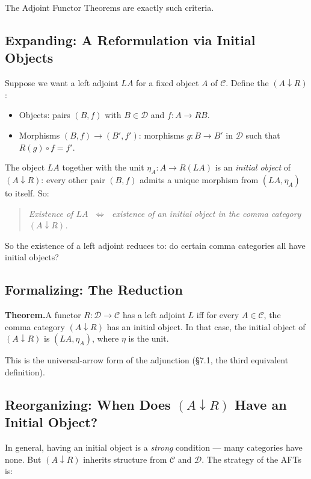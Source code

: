 The Adjoint Functor Theorems are exactly such criteria.

\subsection{Expanding: A Reformulation via Initial Objects}

Suppose we want a left adjoint $L A$ for a fixed object $A$ of $\mathcal{C}$.
Define the  $(A \downarrow R)$:
\begin{itemize}
  \item Objects: pairs $(B, f)$ with $B \in \mathcal{D}$ and $f : A \to R B$.
  \item Morphisms $(B, f) \to (B', f')$: morphisms $g : B \to B'$ in
        $\mathcal{D}$ such that $R(g) \circ f = f'$.
\end{itemize}
The object $L A$ together with the unit $\eta_A : A \to R(L A)$ is an
\emph{initial object} of $(A \downarrow R)$: every other pair $(B, f)$
admits a unique morphism from $(L A, \eta_A)$ to itself. So:
\begin{quote}
\textit{Existence of $L A$ $\;\iff\;$ existence of an initial object in
the comma category $(A \downarrow R)$.}
\end{quote}

So the existence of a left adjoint reduces to: do certain comma
categories all have initial objects?

\subsection{Formalizing: The Reduction}

\textbf{Theorem.}\quad A functor $R : \mathcal{D} \to \mathcal{C}$ has a
left adjoint $L$ iff for every $A \in \mathcal{C}$, the comma category
$(A \downarrow R)$ has an initial object. In that case, the initial object
of $(A \downarrow R)$ is $(L A, \eta_A)$, where $\eta$ is the unit.

This is the universal-arrow form of the adjunction (\S 7.1, the third
equivalent definition).

\subsection{Reorganizing: When Does $(A \downarrow R)$ Have an Initial Object?}

In general, having an initial object is a \emph{strong} condition --- many
categories have none. But $(A \downarrow R)$ inherits structure from
$\mathcal{C}$ and $\mathcal{D}$. The strategy of the AFTs is:

